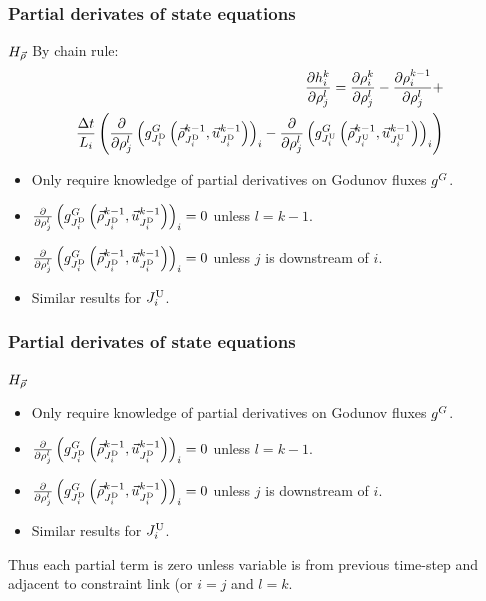 \begin{frame}[t]\frametitle{Partial derivates of state equations}

\begin{block}{$H_{\vec{\rho}}$}
By chain rule:
\begin{align*}
\frac{\partial h_{i}^{k}}{\partial\rho_{j}^{l}}=\frac{\partial\rho_{i}^{k}}{\partial\rho_{j}^{l}}-\frac{\partial\rho_{i}^{k-1}}{\partial\rho_{j}^{l}}+ \\
\frac{\Delta t}{L_{i}}\left(\frac{\partial}{\partial\rho_{j}^{l}}\left(g^{G}_{J_{i}^{\text{D}}}\left(\vec{\rho}_{J_{i}^{\text{D}}}^{k-1},\vec{u}_{J_{i}^{\text{D}}}^{k-1}\right)\right)_{i}-\frac{\partial}{\partial\rho_{j}^{l}}\left(g^{G}_{J_{i}^{\text{U}}}\left(\vec{\rho}_{J_{i}^{\text{U}}}^{k-1},\vec{u}_{J_{i}^{\text{U}}}^{k-1}\right)\right)_{i}\right)\label{eq:dhdugod}
\end{align*}

\begin{itemize}
    \item Only require knowledge of partial derivatives on Godunov fluxes $g^{G}$.
    \item $\frac{\partial}{\partial\rho_{j}^{l}}\left(g^{G}_{J_{i}^{\text{D}}}\left(\vec{\rho}_{J_{i}^{\text{D}}}^{k-1},\vec{u}_{J_{i}^{\text{D}}}^{k-1}\right)\right)_{i} = 0$ unless $l = k - 1$.
    \item $\frac{\partial}{\partial\rho_{j}^{l}}\left(g^{G}_{J_{i}^{\text{D}}}\left(\vec{\rho}_{J_{i}^{\text{D}}}^{k-1},\vec{u}_{J_{i}^{\text{D}}}^{k-1}\right)\right)_{i}= 0$ unless $j$ is downstream of $i$.
    \item Similar results for $J_{i}^{\text{U}}$.
\end{itemize}
\end{block}
\end{frame}

\begin{frame}[t]\frametitle{Partial derivates of state equations}

\begin{block}{$H_{\vec{\rho}}$}
\begin{itemize}
    \item Only require knowledge of partial derivatives on Godunov fluxes $g^{G}$.
    \item $\frac{\partial}{\partial\rho_{j}^{l}}\left(g^{G}_{J_{i}^{\text{D}}}\left(\vec{\rho}_{J_{i}^{\text{D}}}^{k-1},\vec{u}_{J_{i}^{\text{D}}}^{k-1}\right)\right)_{i} = 0$ unless $l = k - 1$.
    \item $\frac{\partial}{\partial\rho_{j}^{l}}\left(g^{G}_{J_{i}^{\text{D}}}\left(\vec{\rho}_{J_{i}^{\text{D}}}^{k-1},\vec{u}_{J_{i}^{\text{D}}}^{k-1}\right)\right)_{i}= 0$ unless $j$ is downstream of $i$.
    \item Similar results for $J_{i}^{\text{U}}$.
\end{itemize}
Thus each partial term is zero unless variable is from previous time-step and adjacent to constraint link (or $i=j$ and $l=k$.
\end{block}
\end{frame}

